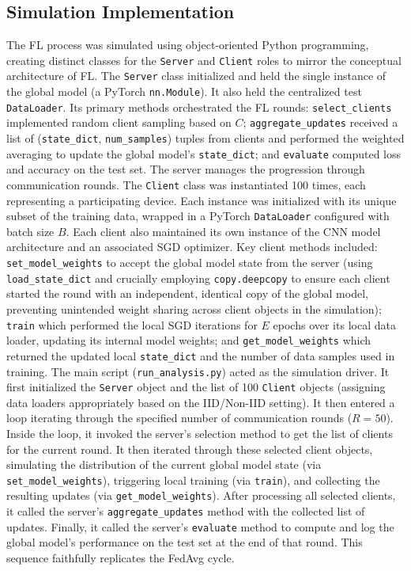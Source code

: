 \documentclass[conference]{IEEEtran}
\begin{document}
\subsection{Simulation Implementation}
The FL process was simulated using object-oriented Python programming, creating distinct classes for the \texttt{Server} and \texttt{Client} roles to mirror the conceptual architecture of FL.
The \texttt{Server} class initialized and held the single instance of the global model (a PyTorch \texttt{nn.Module}). It also held the centralized test \texttt{DataLoader}. Its primary methods orchestrated the FL rounds: \texttt{select\_clients} implemented random client sampling based on $C$; \texttt{aggregate\_updates} received a list of (\texttt{state\_dict}, \texttt{num\_samples}) tuples from clients and performed the weighted averaging to update the global model's \texttt{state\_dict}; and \texttt{evaluate} computed loss and accuracy on the test set. The server manages the progression through communication rounds.
The \texttt{Client} class was instantiated 100 times, each representing a participating device. Each instance was initialized with its unique subset of the training data, wrapped in a PyTorch \texttt{DataLoader} configured with batch size $B$. Each client also maintained its own instance of the CNN model architecture and an associated SGD optimizer. Key client methods included: \texttt{set\_model\_weights} to accept the global model state from the server (using \texttt{load\_state\_dict} and crucially employing \texttt{copy.deepcopy} to ensure each client started the round with an independent, identical copy of the global model, preventing unintended weight sharing across client objects in the simulation); \texttt{train} which performed the local SGD iterations for $E$ epochs over its local data loader, updating its internal model weights; and \texttt{get\_model\_weights} which returned the updated local \texttt{state\_dict} and the number of data samples used in training.
The main script (\texttt{run\_analysis.py}) acted as the simulation driver. It first initialized the \texttt{Server} object and the list of 100 \texttt{Client} objects (assigning data loaders appropriately based on the IID/Non-IID setting). It then entered a loop iterating through the specified number of communication rounds ($R=50$). Inside the loop, it invoked the server's selection method to get the list of clients for the current round. It then iterated through these selected client objects, simulating the distribution of the current global model state (via \texttt{set\_model\_weights}), triggering local training (via \texttt{train}), and collecting the resulting updates (via \texttt{get\_model\_weights}). After processing all selected clients, it called the server's \texttt{aggregate\_updates} method with the collected list of updates. Finally, it called the server's \texttt{evaluate} method to compute and log the global model's performance on the test set at the end of that round. This sequence faithfully replicates the FedAvg cycle.
\end{document}
